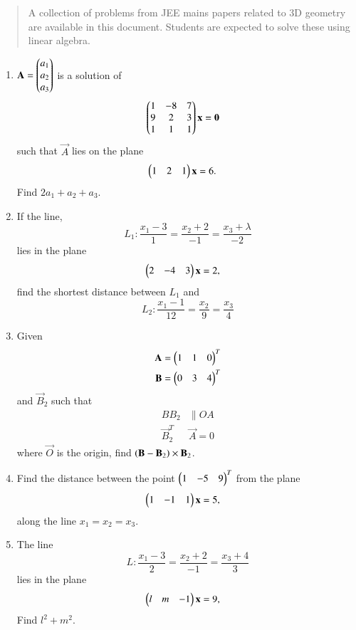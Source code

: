 \documentclass[journal,12pt,twocolumn]{IEEEtran}
\begin{document}
\begin{abstract}
	A  collection of problems from JEE mains papers related to 3D geometry  are available in 
this document.  Students are expected to solve these using linear algebra.
\end{abstract}
\begin{enumerate}[label=\arabic*.]
\item  $\mathbf{A} = \begin{pmatrix}a_1 \\ a_2 \\ a_3\end{pmatrix}$ is a solution of
\begin{align}
\begin{pmatrix}1 & -8 & 7 \\ 9 & 2 & 3 \\ 1 & 1 & 1\end{pmatrix}\mathbf{x} &= \mathbf{0}
\end{align}
%
such that $\vec{A}$ lies on the plane
\begin{align}
\begin{pmatrix}1 & 2 & 1\end{pmatrix}\mathbf{x} &= 6.
\end{align}
%
Find $2a_1+a_2+a_3$.
\item If the line, 
\begin{equation}
L_1:\frac{x_1-3}{1}=
\frac{x_2+2}{-1} = 
\frac{x_3+\lambda}{-2}
\end{equation}
lies in the plane
\begin{align}
\begin{pmatrix}2 & -4 & 3\end{pmatrix}\mathbf{x} &= 2,
\end{align}
find the shortest distance between $L_1$ and
\begin{equation}
L_2:\frac{x_1-1}{12}=
\frac{x_2}{9} = 
\frac{x_3}{4}
\end{equation}
\item Given
\begin{align}
\mathbf{A} = \begin{pmatrix}1 & 1 & 0\end{pmatrix}^T
\\
\mathbf{B} = \begin{pmatrix}0 & 3 & 4\end{pmatrix}^T
\end{align}
and $\vec{B}_2$ such that
\begin{align}
BB_2&\parallel OA
\\
\vec{B}_2^T &\vec{A} = 0
\end{align}
where $\vec{O}$ is the origin, find $\left(\mathbf{B}-\mathbf{B}_2\right)\times \mathbf{B}_2$.
\item Find the distance between the point $\begin{pmatrix}1 & -5 & 9\end{pmatrix}^T$ from the plane 
\begin{align}
\begin{pmatrix}1 & -1 & 1\end{pmatrix}\mathbf{x} &= 5,
\end{align}
along the line $x_1=x_2=x_3$.
\item The line
\begin{equation}
L:\frac{x_1-3}{2}=
\frac{x_2+2}{-1} = 
\frac{x_3+4}{3}
\end{equation}
lies in the plane
\begin{align}
\begin{pmatrix}l & m & -1\end{pmatrix}\mathbf{x} &= 9,
\end{align}
%
Find $l^2+m^2$.


\end{enumerate}
\end{document}
